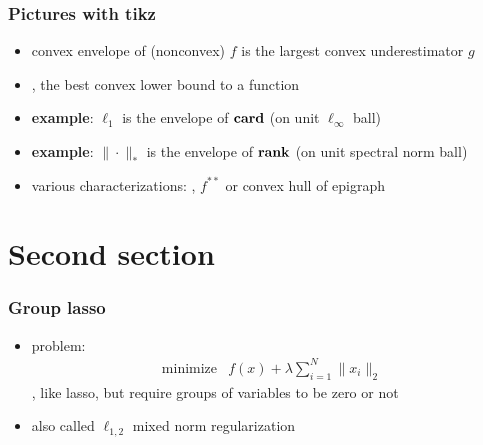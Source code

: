 \documentclass[aspectratio=169,10pt,mathserif]{beamer}
\begin{document}
\begin{frame}
\frametitle{Pictures with tikz}
\begin{itemize}\itemsep=12pt
	\item convex envelope of (nonconvex) $f$ is the largest convex underestimator $g$
    \item \ie, the best convex lower bound to a function
        \vspace*{1em}
\begin{center}
\end{center}
    \item \textbf{example}: $\ell_1$ is the envelope of $\mathop{\bf card}$ (on unit $\ell_\infty$ ball)
    \item \textbf{example}: $\|\cdot\|_*$ is the envelope of $\mathop{\bf rank}$ (on unit spectral norm ball)
    \item various characterizations: \eg, $f^{**}$ or convex hull of epigraph
\end{itemize}
\end{frame}

\section{Second section}

\begin{frame}
\frametitle{Group lasso \\[-0.3em]
}
\begin{itemize}\itemsep=12pt
\item problem:
\[
\begin{array}{ll}
\mbox{minimize} & f(x) + \lambda \sum_{i=1}^N \|x_i\|_2
\end{array}
\]
\ie, like lasso, but require groups of variables to be zero or not
\item also called $\ell_{1,2}$ mixed norm regularization
\end{itemize}
\end{frame}
\end{document}
